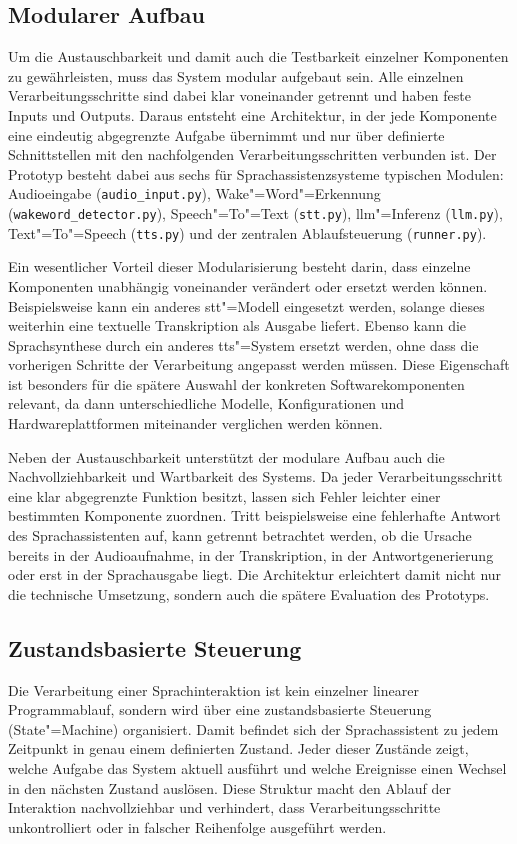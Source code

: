 \subsection{Modularer Aufbau}
\label{subsec:Modularer_Aufbau}
Um die Austauschbarkeit und damit auch die Testbarkeit einzelner Komponenten zu gewährleisten, muss das System modular aufgebaut sein. Alle einzelnen Verarbeitungsschritte sind dabei klar voneinander getrennt und haben feste Inputs und Outputs. Daraus entsteht eine Architektur, in der jede Komponente eine eindeutig abgegrenzte Aufgabe übernimmt und nur über definierte Schnittstellen mit den nachfolgenden Verarbeitungsschritten verbunden ist. Der Prototyp besteht dabei aus sechs für Sprachassistenzsysteme typischen Modulen: Audioeingabe (\texttt{audio\_input.py}), Wake"=Word"=Erkennung (\texttt{wakeword\_detector.py}), Speech"=To"=Text (\texttt{stt.py}), \gls{llm}"=Inferenz (\texttt{llm.py}), Text"=To"=Speech (\texttt{tts.py}) und der zentralen Ablaufsteuerung (\texttt{runner.py}).

Ein wesentlicher Vorteil dieser Modularisierung besteht darin, dass einzelne Komponenten unabhängig voneinander verändert oder ersetzt werden können. Beispielsweise kann ein anderes \gls{stt}"=Modell eingesetzt werden, solange dieses weiterhin eine textuelle Transkription als Ausgabe liefert. Ebenso kann die Sprachsynthese durch ein anderes \gls{tts}"=System ersetzt werden, ohne dass die vorherigen Schritte der Verarbeitung angepasst werden müssen. Diese Eigenschaft ist besonders für die spätere Auswahl der konkreten Softwarekomponenten relevant, da dann unterschiedliche Modelle, Konfigurationen und Hardwareplattformen miteinander verglichen werden können.

Neben der Austauschbarkeit unterstützt der modulare Aufbau auch die Nachvollziehbarkeit und Wartbarkeit des Systems. Da jeder Verarbeitungsschritt eine klar abgegrenzte Funktion besitzt, lassen sich Fehler leichter einer bestimmten Komponente zuordnen. Tritt beispielsweise eine fehlerhafte Antwort des Sprachassistenten auf, kann getrennt betrachtet werden, ob die Ursache bereits in der Audioaufnahme, in der Transkription, in der Antwortgenerierung oder erst in der Sprachausgabe liegt. Die Architektur erleichtert damit nicht nur die technische Umsetzung, sondern auch die spätere Evaluation des Prototyps.


\subsection{Zustandsbasierte Steuerung}
\label{subsec:Zustandsbasierte_Steuerung}
Die Verarbeitung einer Sprachinteraktion ist kein einzelner linearer Programmablauf, sondern wird über eine zustandsbasierte Steuerung (State"=Machine) organisiert. Damit befindet sich der Sprachassistent zu jedem Zeitpunkt in genau einem definierten Zustand. Jeder dieser Zustände zeigt, welche Aufgabe das System aktuell ausführt und welche Ereignisse einen Wechsel in den nächsten Zustand auslösen. Diese Struktur macht den Ablauf der Interaktion nachvollziehbar und verhindert, dass Verarbeitungsschritte unkontrolliert oder in falscher Reihenfolge ausgeführt werden.

